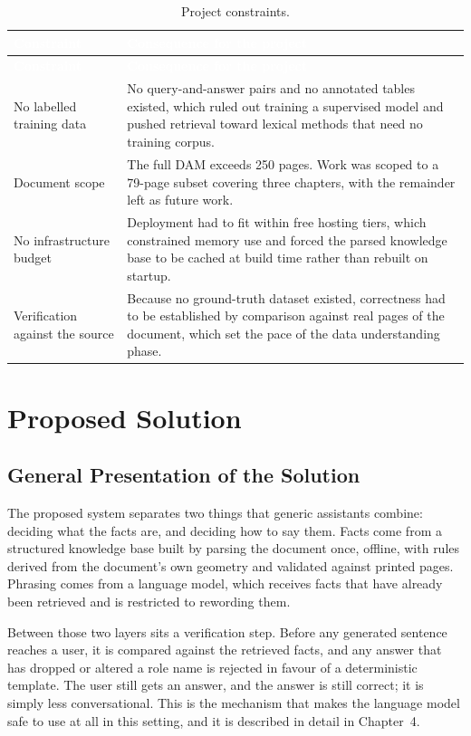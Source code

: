 \begin{longtable}{|p{}|p{}|}
\caption{Project constraints.}\label{tab:constraints}\\
\hline
\rowcolor{thesisgreen}\textcolor{white}{\textbf{Constraint}} & \textcolor{white}{\textbf{Consequence for the project}} \\
\hline
\endfirsthead
\hline
\rowcolor{thesisgreen}\textcolor{white}{\textbf{Constraint}} & \textcolor{white}{\textbf{Consequence for the project}} \\
\hline
\endhead
No labelled training data & No query-and-answer pairs and no annotated tables existed, which ruled out training a supervised model and pushed retrieval toward lexical methods that need no training corpus. \\ \hline
Document scope & The full DAM exceeds 250 pages. Work was scoped to a 79-page subset covering three chapters, with the remainder left as future work. \\ \hline
No infrastructure budget & Deployment had to fit within free hosting tiers, which constrained memory use and forced the parsed knowledge base to be cached at build time rather than rebuilt on startup. \\ \hline
Verification against the source & Because no ground-truth dataset existed, correctness had to be established by comparison against real pages of the document, which set the pace of the data understanding phase. \\ \hline
\end{longtable}

\section{Proposed Solution}

\subsection{General Presentation of the Solution}

The proposed system separates two things that generic assistants combine: deciding what the facts are, and deciding how to say them. Facts come from a structured knowledge base built by parsing the document once, offline, with rules derived from the document's own geometry and validated against printed pages. Phrasing comes from a language model, which receives facts that have already been retrieved and is restricted to rewording them.

Between those two layers sits a verification step. Before any generated sentence reaches a user, it is compared against the retrieved facts, and any answer that has dropped or altered a role name is rejected in favour of a deterministic template. The user still gets an answer, and the answer is still correct; it is simply less conversational. This is the mechanism that makes the language model safe to use at all in this setting, and it is described in detail in Chapter~4.


